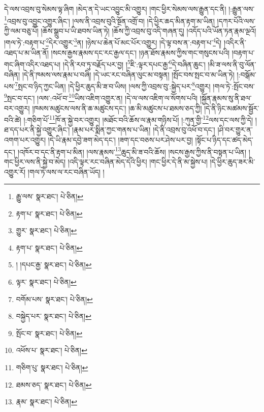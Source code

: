 དེ་ལས་འབྲས་བུ་སེམས་ལྟ་ཞིག །མེད་ན་དེ་ཡང་འབྱུང་མི་འགྱུར། །གང་ཕྱིར་སེམས་ལས་རྒྱུན་དང་ནི། །:རྒྱུན་ལས་\footnote{རྒྱུ་ལས་  སྣར་ཐང་།  པེ་ཅིན། }འབྲས་བུ་འབྱུང་འགྱུར་ཞིང་། །ལས་ནི་འབྲས་བུའི་སྔོན་འགྲོ་བ། །དེ་ཕྱིར་ཆད་མིན་རྟག་མ་ཡིན། །དཀར་པོའི་ལས་ཀྱི་ལམ་བཅུ་པོ། །ཆོས་སྒྲུབ་པ་ཡི་ཐབས་ཡིན་ཏེ། །ཆོས་ཀྱི་འབྲས་བུ་འདི་གཞན་དུ། །འདོད་པའི་ཡོན་ཏན་རྣམ་ལྔའོ། །གལ་ཏེ་:བརྟག་པ་\footnote{རྟག་པ་  སྣར་ཐང་།  པེ་ཅིན། }དེར་འགྱུར་\footnote{གྱུར་  སྣར་ཐང་།  པེ་ཅིན། }ན། །ཉེས་པ་ཆེན་པོ་མང་པོར་འགྱུར། །དེ་ལྟ་བས་ན་:བརྟག་པ་\footnote{རྟག་པ་  སྣར་ཐང་།  པེ་ཅིན། }དེ། །འདིར་ནི་འཐད་པ་མ་ཡིན་ནོ། །སངས་རྒྱས་རྣམས་དང་རང་རྒྱལ་དང་། །ཉན་ཐོས་རྣམས་ཀྱིས་གང་གསུངས་པའི། །བརྟག་པ་གང་ཞིག་འདིར་འཐད་པ། །དེ་ནི་རབ་ཏུ་བརྗོད་པར་བྱ། །\footnote{། །དཔང་རྒྱ་  སྣར་ཐང་།  པེ་ཅིན། }ཇི་:ལྟར་དཔང་རྒྱ་\footnote{ལྟར་  སྣར་ཐང་།  པེ་ཅིན། }དེ་བཞིན་ཆུང་། །མི་ཟ་ལས་ནི་བུ་ལོན་བཞིན། །དེ་ནི་ཁམས་ལས་རྣམ་པ་བཞི། །དེ་ཡང་རང་བཞིན་ལུང་མ་བསྟན། །སྤོང་བས་སྤང་བ་མ་ཡིན་ཏེ། །:བསྒོམ་པས་\footnote{བགོམ་པས་  སྣར་ཐང་།  པེ་ཅིན། }སྤང་བ་ཉིད་ཀྱང་ཡིན། །དེ་ཕྱིར་ཆུད་མི་ཟ་བ་ཡིས། །ལས་ཀྱི་འབྲས་བུ་:སྐྱེད་པར་\footnote{བསྐྱེད་པར་  སྣར་ཐང་།  པེ་ཅིན། }འགྱུར། །གལ་ཏེ་:སྤོང་བས་\footnote{སྤོང་བ་  སྣར་ཐང་།  པེ་ཅིན། }སྤང་བ་དང་། །ལས་:འཕོ་བ་\footnote{འཕོས་པ་  སྣར་ཐང་།  པེ་ཅིན། }ཡིས་འཇིག་འགྱུར་ན། །དེ་ལ་ལས་འཇིག་ལ་སོགས་པའི། །སྐྱོན་རྣམས་སུ་ནི་ཐལ་བར་འགྱུར། །ཁམས་མཚུངས་ལས་ནི་ཆ་མཚུངས་དང་། །ཆ་མི་མཚུངས་པ་ཐམས་ཅད་ཀྱི། །དེ་ནི་ཉིང་མཚམས་སྦྱོར་བའི་ཚེ། །:གཅིག་པོ་\footnote{གཅིག་པུ་  སྣར་ཐང་།  པེ་ཅིན། }ཁོ་ན་སྐྱེ་བར་འགྱུར། །མཐོང་བའི་ཆོས་ལ་རྣམ་གཉིས་པོ། །:ཀུན་གྱི་\footnote{ཐམས་ཅད་  སྣར་ཐང་།  པེ་ཅིན། }ལས་དང་ལས་ཀྱི་དེ། །ཐ་དད་པར་ནི་སྐྱེ་འགྱུར་ཞིང་། །རྣམ་པར་སྨིན་ཀྱང་གནས་པ་ཡིན། །དེ་ནི་འབྲས་བུ་འཕོ་བ་དང་། །ཤི་བར་གྱུར་ན་འགག་པར་འགྱུར། །དེ་ཡི་རྣམ་དབྱེ་ཟག་མེད་དང་། །ཟག་དང་བཅས་པར་ཤེས་པར་བྱ། །སྟོང་པ་ཉིད་དང་ཚད་མེད་དང་། །འཁོར་བ་དང་ནི་རྟག་པ་མིན། །ལས་རྣམས་\footnote{རྣམ་  སྣར་ཐང་།  པེ་ཅིན། }ཆུད་མི་ཟ་བའི་ཆོས། །སངས་རྒྱས་ཀྱིས་ནི་བསྟན་པ་ཡིན། །གང་ཕྱིར་ལས་ནི་སྐྱེ་བ་མེད། །འདི་ལྟར་རང་བཞིན་མེད་དེའི་ཕྱིར། །གང་ཕྱིར་དེ་ནི་མ་སྐྱེས་པ། །དེ་ཕྱིར་ཆུད་ཟར་མི་འགྱུར་རོ། །གལ་ཏེ་ལས་ལ་རང་བཞིན་ཡོད། །
